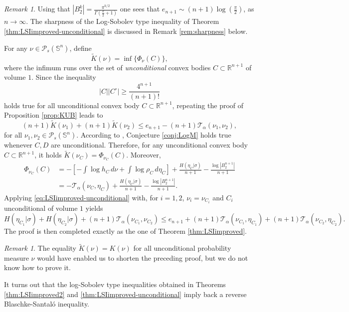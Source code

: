 \documentclass[10pt]{amsart}
\theoremstyle{definition}
\theoremstyle{remark}
\newtheorem{rem}[thm]{Remark}
\newcommand{\R}{\mathbb{R}}
\newcommand{\Sd}{\mathbb{S}}
\begin{document}
\begin{rem} Using that $|B_2^k| = \frac{\pi^{k/2}}{\Gamma(\frac{k}{2}+1)}$ one sees that
$e_{n+1} \sim (n+1) \log \left(\frac{\pi}{2}\right)$,
as $n \to \infty$. The sharpness of the Log-Sobolev type inequality of Theorem \ref{thm:LSIimproved-unconditional} is discussed in Remark \ref{rem:sharpness} below.
\end{rem}


\proof
For any $\nu \in \mathcal{P}_s(\Sd^n)$, define 
\[
\tilde{K}(\nu) = \inf \{\Phi_\nu(C)\},
\]
where the infimum runs over the set of \emph{unconditional} convex bodies $C \subset \R^{n+1}$ of volume $1$.
Since the inequality
\[
|C||C^\circ| \geq \frac{4^{n+1}}{(n+1)!}
\]
holds true for all unconditional convex body $C \subset \R^{n+1}$, repeating the proof of Proposition \ref{prop:KUB} leads to
\begin{equation}\label{eq:LSIimproved-unconditional}
(n+1)\tilde{K}(\nu_1)+(n+1)\tilde{K}(\nu_2) \leq e_{n+1}-(n+1)\mathcal{T}_\alpha(\nu_1,\nu_2),
\end{equation}
for all $\nu_1,\nu_2 \in \mathcal{P}_s(\Sd^n)$.
According to \cite[Corollary 1.3]{Sar15}, Conjecture \ref{conj:LogM} holds true whenever $C,D$ are unconditional. Therefore, for any unconditional convex body $C \subset \R^{n+1}$, it holds $\tilde{K}(\nu_C) = \Phi_{\nu_C}(C)$. 
Moreover,
\begin{align*}
\Phi_{\nu_C}(C) & = - \left[-\int \log h_{C}\,d\nu + \int \log \rho_{C}\,d\eta_{C}\right] + \frac{H(\eta_{C}|\sigma)}{n+1}- \frac{\log |B_2^{n+1}|}{n+1}\\
& =  - \mathcal{T}_{\alpha}(\nu_C,\eta_C) + \frac{H(\eta_{C}|\sigma)}{n+1}- \frac{\log |B_2^{n+1}|}{n+1}.
\end{align*}
Applying \eqref{eq:LSIimproved-unconditional} with, for $i=1,2$, $\nu_i = \nu_{C_i}$ and $C_i$ unconditional of volume $1$ yields 
\[
H(\eta_{C_1} | \sigma)+ H(\eta_{C_2} | \sigma) + (n+1)\mathcal{T}_\alpha(\nu_{C_1},\nu_{C_2})\leq e_{n+1} + (n+1)\mathcal{T}_{\alpha}(\nu_{C_1},\eta_{C_1})+(n+1)\mathcal{T}_{\alpha}(\nu_{C_2},\eta_{C_2}).
\]
The proof is then completed exactly as the one of Theorem \ref{thm:LSIimproved}.
\endproof
\begin{rem}
The equality $\tilde{K}(\nu) = K(\nu)$ for all unconditional probability measure $\nu$ would have enabled us to shorten the preceding proof, but we do not know how to prove it. 
\end{rem}

It turns out that the log-Sobolev type inequalities obtained in Theorems \ref{thm:LSIimproved2} and \ref{thm:LSIimproved-unconditional} imply back a reverse Blaschke-Santal\'o inequality. 
\end{document}
